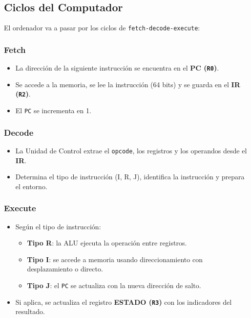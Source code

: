 \documentclass{article}
\begin{document}
\subsection{Ciclos del Computador}

El ordenador va a pasar por los ciclos de \texttt{fetch-decode-execute}:

\subsubsection{Fetch}

\begin{itemize}
    \item La dirección de la siguiente instrucción se encuentra en el \textbf{PC (\texttt{R0})}.
    \item Se accede a la memoria, se lee la instrucción (64 bits) y se guarda en el \textbf{IR (\texttt{R2})}.
    \item El \texttt{PC} se incrementa en 1.
\end{itemize}

\subsubsection{Decode}

\begin{itemize}
    \item La Unidad de Control extrae el \texttt{opcode}, los registros y los operandos desde el \textbf{IR}.
    \item Determina el tipo de instrucción (I, R, J), identifica la instrucción y prepara el entorno.
\end{itemize}

\subsubsection{Execute}

\begin{itemize}
    \item Según el tipo de instrucción:
    \begin{itemize}
        \item \textbf{Tipo R}: la ALU ejecuta la operación entre registros.
        \item \textbf{Tipo I}: se accede a memoria usando direccionamiento con desplazamiento o directo.
        \item \textbf{Tipo J}: el \texttt{PC} se actualiza con la nueva dirección de salto.
    \end{itemize}
    \item Si aplica, se actualiza el registro \textbf{ESTADO (\texttt{R3})} con los indicadores del resultado.
\end{itemize}
\end{document}
